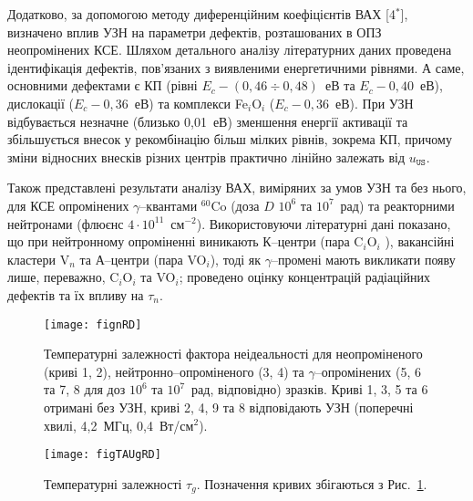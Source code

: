 Додатково, за допомогою методу диференційним коефіцієнтів ВАХ
[4$^*$], визначено вплив УЗН на параметри дефектів, розташованих в ОПЗ неопромінених КСЕ.
Шляхом детального аналізу літературних даних проведена ідентифікація дефектів, пов'язаних з виявленими енергетичними рівнями.
А саме, основними дефектами є КП (рівні $E_c-(0,46\div0,48)$~еВ та $E_c-0,40$~еВ), дислокації ($E_c-0,36$~еВ) та комплекси Fe$_i$O$_i$ ($E_c-0,36$~еВ).
При УЗН відбувається незначне (близько 0,01~еВ) зменшення енергії активації та збільшується внесок
у рекомбінацію більш мілких рівнів, зокрема КП, причому зміни відносних внесків різних центрів практично лінійно залежать від $u_\mathtt{US}$.

Також представлені результати аналізу ВАХ, виміряних за умов УЗН та без нього, для КСЕ опромінених $\gamma$--квантами $^{60}$Co (доза $D$ $10^6$ та $10^7$~рад) та реакторними нейтронами (флюєнс $4\cdot10^{11}$~см$^{-2}$).
Використовуючи літературні дані показано, що при нейтронному опроміненні виникають К--центри (пара C$_i$O$_i$ ),
вакансійні кластери V$_n$ та А--центри (пара VO$_i$), тоді як $\gamma$--промені мають викликати появу лише, переважно, C$_i$O$_i$ та VO$_i$;
проведено оцінку концентрацій радіаційних дефектів та їх впливу на $\tau_n$.

\begin{figure}[ht]
\center
\texttt{[image: fignRD]}%
\caption{\label{fignRD}
Температурні залежності фактора неідеальності
для неопроміненого (криві 1, 2),
нейтронно--опроміненого (3, 4) та
$\gamma$--опромінених (5, 6 та 7, 8 для доз $10^6$ та $10^7$~рад, відповідно)
зразків.
Криві 1, 3, 5 та 6 отримані без УЗН,
криві 2, 4, 9 та 8 відповідають УЗН (поперечні хвилі, 4,2~МГц, 0,4~Вт/см$^2$).
}%
\end{figure}


\begin{figure}[ht]
\center
\texttt{[image: figTAUgRD]}%
\caption{\label{figTAUgRD}
Температурні залежності $\tau_g$.
Позначення кривих збігаються з Рис.~\ref{fignRD}.
}%
\end{figure}

